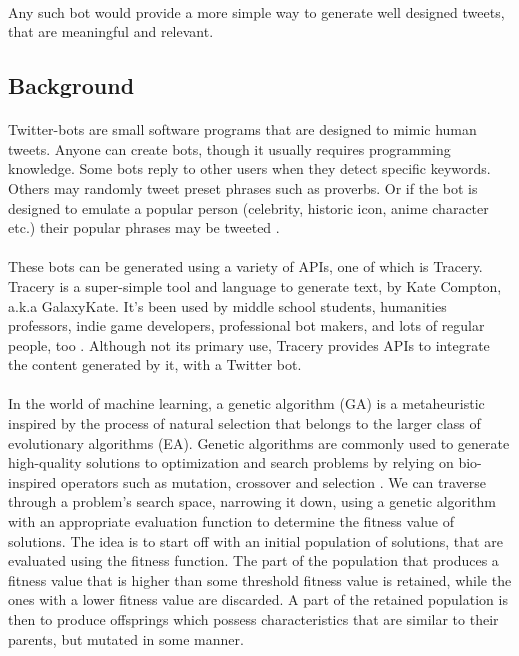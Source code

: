 \documentclass[11pt]{article}
\begin{document}
        \paragraph{}
        Any such bot would provide a more simple way to generate well designed tweets, that are meaningful and relevant.

        \subsection{Background}
        \paragraph{}
        Twitter-bots are small software programs that are designed to mimic human tweets. Anyone can create bots, though it usually requires programming knowledge. Some bots reply to other users when they detect specific keywords. Others may randomly tweet preset phrases such as proverbs. Or if the bot is designed to emulate a popular person (celebrity, historic icon, anime character etc.) their popular phrases may be tweeted \cite{twitterBot}.
        \paragraph{}
        These bots can be generated using a variety of APIs, one of which is Tracery. Tracery is a super-simple tool and language to generate text, by Kate Compton, a.k.a GalaxyKate. It's been used by middle school students, humanities professors, indie game developers, professional bot makers, and lots of regular people, too \cite{tracery}. Although not its primary use, Tracery provides APIs to integrate the content generated by it, with a Twitter bot.
        \paragraph{}
        In the world of machine learning, a genetic algorithm (GA) is a metaheuristic inspired by the process of natural selection that belongs to the larger class of evolutionary algorithms (EA). Genetic algorithms are commonly used to generate high-quality solutions to optimization and search problems by relying on bio-inspired operators such as mutation, crossover and selection \cite{geneticAlgorithm}. We can traverse through a problem's search space, narrowing it down, using a genetic algorithm with an appropriate evaluation function to determine the fitness value of solutions. The idea is to start off with an initial population of solutions, that are evaluated using the fitness function. The part of the population that produces a fitness value that is higher than some threshold fitness value is retained, while the ones with a lower fitness value are discarded. A part of the retained population is then to produce offsprings which possess characteristics that are similar to their parents, but mutated in some manner.
\end{document}
